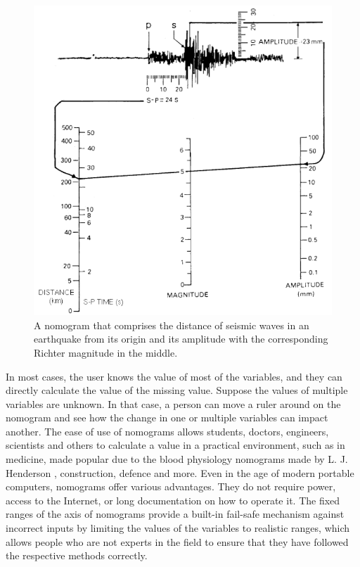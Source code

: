 \documentclass{l4proj}
\begin{document}
\begin{figure}[hbt!]
    
    \centering
    \includegraphics[width=.75\linewidth]{dissertation/images/myFigures/introduction/richter-scale.pdf}    

    \caption{
    A nomogram that comprises the distance of seismic waves in an earthquake from its origin and its amplitude with the corresponding Richter magnitude in the middle. \protect \citep{stimac_what_nodate}}

    \label{fig:richter} 
\end{figure}

In most cases, the user knows the value of most of the variables, and they can directly calculate the value of the missing value. Suppose the values of multiple variables are unknown. In that case, a person can move a ruler around on the nomogram and see how the change in one or multiple variables can impact another. The ease of use of nomograms allows students, doctors, engineers, scientists and others to calculate a value in a practical environment, such as in medicine, made popular due to the blood physiology nomograms made by L. J. Henderson \citep{hankins_blood_1999}, construction, defence and more. Even in the age of modern portable computers, nomograms offer various advantages. They do not require power, access to the Internet, or long documentation on how to operate it. The fixed ranges of the axis of nomograms provide a built-in fail-safe mechanism against incorrect inputs by limiting the values of the variables to realistic ranges, which allows people who are not experts in the field to ensure that they have followed the respective methods correctly.     
\end{document}
